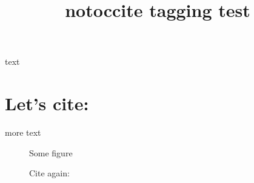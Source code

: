\documentclass{article}
\title{notoccite tagging test}
\begin{document}
\tableofcontents

\listoffigures

\bigskip

text \cite{misc-full}

\section{Let's cite: \cite{inproceedings-full}}

more text \cite{inbook-full}
\begin{figure}
\centering
Some figure
\caption{Cite again: \cite{phdthesis-minimal}}
\end{figure}



\end{document}
